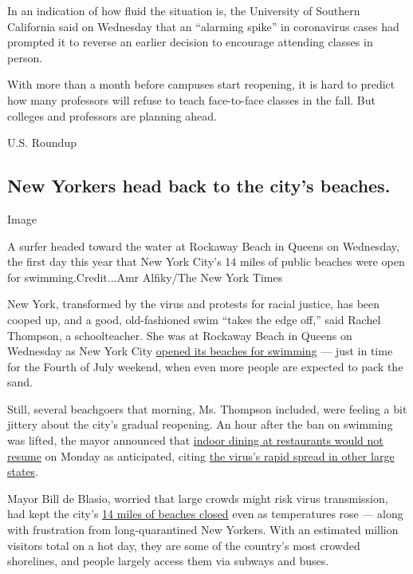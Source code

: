 In an indication of how fluid the situation is, the University of
Southern California said on Wednesday that an ``alarming spike'' in
coronavirus cases had prompted it to reverse an earlier decision to
encourage attending classes in person.

With more than a month before campuses start reopening, it is hard to
predict how many professors will refuse to teach face-to-face classes in
the fall. But colleges and professors are planning ahead.

U.S. Roundup

\hypertarget{new-yorkers-head-back-to-the-citys-beaches}{%
\subsection{New Yorkers head back to the city's
beaches.}\label{new-yorkers-head-back-to-the-citys-beaches}}

Image

A surfer headed toward the water at Rockaway Beach in Queens on
Wednesday, the first day this year that New York City's 14 miles of
public beaches were open for swimming.Credit...Amr Alfiky/The New York
Times

New York, transformed by the virus and protests for racial justice, has
been cooped up, and a good, old-fashioned swim ``takes the edge off,''
said Rachel Thompson, a schoolteacher. She was at Rockaway Beach in
Queens on Wednesday as New York City
\href{https://www.nytimes3xbfgragh.onion/2020/07/03/nyregion/beaches-open-nyc.html}{opened
its beaches for swimming} --- just in time for the Fourth of July
weekend, when even more people are expected to pack the sand.

Still, several beachgoers that morning, Ms. Thompson included, were
feeling a bit jittery about the city's gradual reopening. An hour after
the ban on swimming was lifted, the mayor announced that
\href{https://www.nytimes3xbfgragh.onion/2020/07/01/nyregion/indoor-dining-coronavirus-nyc.html}{indoor
dining at restaurants would not resume} on Monday as anticipated, citing
\href{https://www.nytimes3xbfgragh.onion/2020/07/03/world/coronavirus-updates.html}{the
virus's rapid spread in other large states}.

Mayor Bill de Blasio, worried that large crowds might risk virus
transmission, had kept the city's
\href{https://www.nytimes3xbfgragh.onion/2020/05/16/nyregion/nyc-beaches-coronavirus.html}{14
miles of beaches closed} even as temperatures rose --- along with
frustration from long-quarantined New Yorkers. With an estimated million
visitors total on a hot day, they are some of the country's most crowded
shorelines, and people largely access them via subways and buses.

